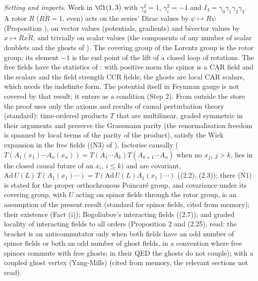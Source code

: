 \emph{Setting and imports.} Work in $\Cl(1,3)$ with $\gamma_{0}^{2} = 1$, $\gamma_{i}^{2} = -1$ and $I_{4} = \gamma_{0}\gamma_{1}\gamma_{2}\gamma_{3}$. A rotor $R$ ($R\tilde R = 1$, even) acts on the series' Dirac values by $\psi \mapsto R\psi$ (Proposition ), on vector values (potentials, gradients) and bivector values by $x \mapsto Rx\tilde R$, and trivially on scalar values (the components of any number of scalar doublets and the ghosts of ). The covering group of the Lorentz group is the rotor group; its element $-1$ is the end point of the lift of a closed loop of rotations. The free fields have the statistics of : with positive norm the spinor is a CAR field and the scalars and the field strength CCR fields; the ghosts are local CAR scalars, which needs the indefinite form. The potential itself in Feynman gauge is not covered by that result; it enters as a condition (Step 2). From outside the store the proof uses only the axioms and results of causal perturbation theory (standard): time-ordered products $T$ that are multilinear, graded symmetric in their arguments and preserve the Grassmann parity (the renormalisation freedom is spanned by local terms of the parity of the product), satisfy the Wick expansion in the free fields ((N3) of \cite{DutschFredenhagen1999}), factorise causally ($T(A_{1}(x_{1})\cdots A_{n}(x_{n})) = T(A_{1}\cdots A_{k})T(A_{k+1}\cdots A_{n})$ when no $x_{j}$, $j > k$, lies in the closed causal future of an $x_{i}$, $i \le k$) and are covariant, $\mathrm{Ad}\,U(L)\,T(A_{1}(x_{1})\cdots) = T(\mathrm{Ad}\,U(L)A_{1}(x_{1})\cdots)$ \cite{DutschFredenhagen1999} ((2.2), (2.3)); there (N1) is stated for the proper orthochronous Poincar\'e group, and covariance under its covering group, with $U$ acting on spinor fields through the rotor group, is an assumption of the present result (standard for spinor fields, cited from memory); their existence \cite{EpsteinGlaser1973} (Fact (i)); Bogoliubov's interacting fields \cite{DutschFredenhagen1999} ((2.7)); and graded locality of interacting fields to all orders \cite{DutschFredenhagen1999} (Proposition 2 and (2.25), read: the bracket is an anticommutator only when both fields have an odd number of spinor fields or both an odd number of ghost fields, in a convention where free spinors commute with free ghosts; in their QED the ghosts do not couple); with a coupled ghost vertex (Yang-Mills) \cite{Hollands2008} (cited from memory, the relevant sections not read).

